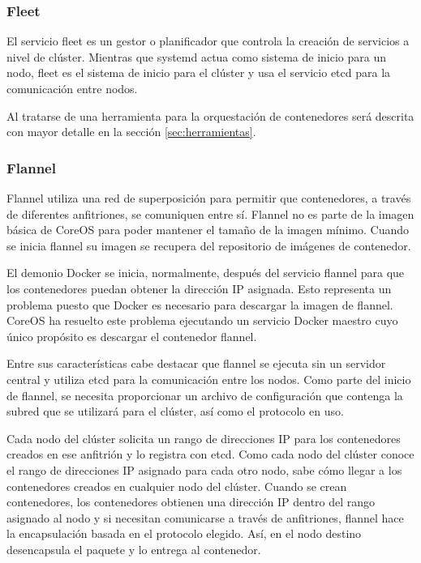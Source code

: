 \subsubsection{Fleet} \label{sssec:fleet}

El servicio fleet es un gestor o planificador que controla la creación de servicios a nivel de clúster. Mientras que systemd actua como sistema de inicio para un nodo, fleet es el sistema de inicio para el clúster y usa el servicio etcd para la comunicación entre nodos.

Al tratarse de una herramienta para la orquestación de contenedores será descrita con mayor detalle en la sección \ref{sec:herramientas}.

\subsubsection{Flannel}

Flannel utiliza una red de superposición para permitir que contenedores, a través de diferentes anfitriones, se comuniquen entre sí. Flannel no es parte de la imagen básica de CoreOS para poder mantener el tamaño de la imagen mínimo. Cuando se inicia flannel su imagen se recupera del repositorio de imágenes de contenedor. 

El demonio Docker se inicia, normalmente, después del servicio flannel para que los contenedores puedan obtener la dirección IP asignada. Esto representa un problema puesto que Docker es necesario para descargar la imagen de flannel. CoreOS ha resuelto este problema ejecutando un servicio Docker maestro cuyo único propósito es descargar el contenedor flannel.

Entre sus características cabe destacar que flannel se ejecuta sin un servidor central y utiliza etcd para la comunicación entre los nodos. Como parte del inicio de flannel, se necesita proporcionar un archivo de configuración que contenga la subred que se utilizará para el clúster, así como el protocolo en uso.

Cada nodo del clúster solicita un rango de direcciones IP para los contenedores creados en ese anfitrión y lo registra con etcd. Como cada nodo del clúster conoce el rango de direcciones IP asignado para cada otro nodo, sabe cómo llegar a los contenedores creados en cualquier nodo del clúster. Cuando se crean contenedores, los contenedores obtienen una dirección IP dentro del rango asignado al nodo y si necesitan comunicarse a través de anfitriones, flannel hace la encapsulación basada en el protocolo elegido. Así, en el nodo destino desencapsula el paquete y lo entrega al contenedor.

